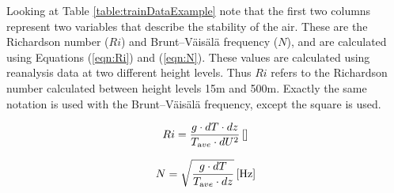 \begin{table}[h]
    \caption[An example of data structure used to train model]{An example of data structure used to train model. Data points include the derived variables Ri and N, the elevation of the station, direction of wind and relative direction of the wind (twd, that is the direction of the wind relative to center of Iceland), along with some combination of wind speed, pressure and temperature at the different height levels. Finally there are the elevation points around a given station, where the elevation is relative to the station.}
    \label{table:trainDataExample}
\end{table}

Looking at Table \ref{table:trainDataExample} note that the first two columns represent two variables that describe the stability of the air. These are the Richardson number ($Ri$)\cite{richardson_number_skybrary} and Brunt–Väisälä frequency\cite{brunt_vaisala_freq_eumtrain} ($N$), and are calculated using Equations (\ref{eqn:Ri}) and (\ref{eqn:N})\cite{mean_gust_HA_HO}. These values are calculated using reanalysis data at two different height levels. Thus $Ri$ refers to the Richardson number calculated between height levels 15m and 500m. Exactly the same notation is used with the Brunt–Väisälä frequency, except the square is used.

\begin{equation}
    \label{eqn:Ri}
    Ri = \frac{g \cdot dT \cdot dz}{T_{\textrm ave} \cdot dU^2} \, \mathrm{[]}
\end{equation}

\begin{equation}
    \label{eqn:N}
    N = \sqrt{\frac{g \cdot dT }{T_{\textrm ave} \cdot dz}} \, \mathrm{[Hz]}
\end{equation}


